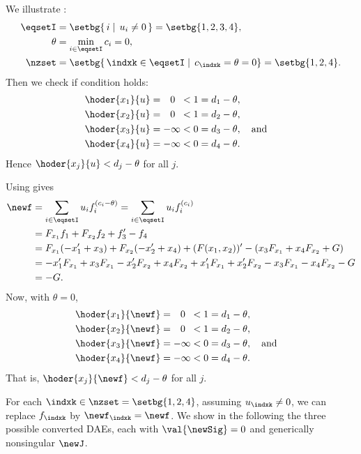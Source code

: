 \begin{example}
We illustrate :
\begin{align*}
\eqsetI &= \setbg{\,i \mid\, u_i\neq 0\,} = \setbg{1,2,3,4}, \\
\theta &= \min_{i\in \eqsetI}c_i=0, \\
\nzset &= \setbg{\,\indxk\in \eqsetI \mid\, c_\indxk=\theta=0} = \setbg{1,2,4}.
\end{align*}
Then we check if condition  holds:
\begin{align*}
\hoder{x_1}{u} &= \;\;\, 0 \;\;< 1 = d_1-\theta, \\
\hoder{x_2}{u} &= \;\;\, 0 \;\;< 1 = d_2-\theta, \\
\hoder{x_3}{u} &= -\infty < 0 = d_3-\theta,\quad\text{and}\quad \\
\hoder{x_4}{u} &= -\infty < 0 = d_4-\theta. \qquad
\end{align*}
Hence $\hoder{x_j}{u}<d_j-\theta$ for all $j$.

Using  gives
\begin{align*}
\newf &= \sum_{i\in \eqsetI} u_i f_i^{(c_i-\theta)} 
= \sum_{i\in \eqsetI} u_i f_i^{(c_i)} 
\\&= F_{x_1} f_1 + F_{x_2} f_2 + f'_3 - f_4 \\
&= F_{x_1} (-x'_1+x_3) + F_{x_2} (-x'_2+x_4) + (F(x_1,x_2))' - (x_3 F_{x_1}+ x_4 F_{x_2}+G) \\
&= - x'_1F_{x_1} + x_3F_{x_1} -  x'_2F_{x_2} + x_4F_{x_2} + x'_1F_{x_1} + x'_2F_{x_2} - x_3F_{x_1} - x_4F_{x_2} -G \\
&= -G.
\end{align*}
Now, with $\theta=0$,
\begin{align*}
\hoder{x_1}{\newf} &= \;\;\, 0 \;\; < 1 = d_1-\theta, \\
\hoder{x_2}{\newf} &= \;\;\, 0 \;\; < 1 = d_2-\theta, \\
\hoder{x_3}{\newf} &= -\infty < 0 = d_3-\theta, \quad\text{and}\quad\\
\hoder{x_4}{\newf} &= -\infty < 0 = d_4-\theta. \qquad
\end{align*}
That is, $\hoder{x_j}{\newf}<d_j-\theta$ for all $j$. 


For each $\indxk\in \nzset=\setbg{1,2,4}$, assuming $u_\indxk\neq 0$, we can replace $f_\indxk$ by $\newf_\indxk=\newf$. We show in the following the three possible converted DAEs, each with $\val{\newSig}=0$ and generically nonsingular $\newJ$.


\end{example}
